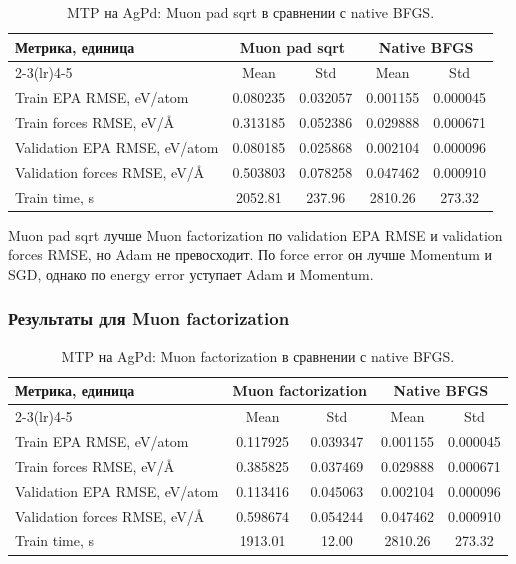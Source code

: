 \begin{table}[H]
\centering
\small
\caption{MTP на AgPd: Muon pad sqrt в сравнении с native BFGS.}
\label{tab:mtp-muon-pad}
\begin{tabular}{lcccc}
\toprule
\multirow{2}{*}{Метрика, единица} & \multicolumn{2}{c}{Muon pad sqrt} & \multicolumn{2}{c}{Native BFGS} \\
\cmidrule(lr){2-3}\cmidrule(lr){4-5}
 & Mean & Std & Mean & Std \\
\midrule
Train EPA RMSE, eV/atom & 0.080235 & 0.032057 & 0.001155 & 0.000045 \\
Train forces RMSE, eV/\AA & 0.313185 & 0.052386 & 0.029888 & 0.000671 \\
Validation EPA RMSE, eV/atom & 0.080185 & 0.025868 & 0.002104 & 0.000096 \\
Validation forces RMSE, eV/\AA & 0.503803 & 0.078258 & 0.047462 & 0.000910 \\
Train time, s & 2052.81 & 237.96 & 2810.26 & 273.32 \\
\bottomrule
\end{tabular}
\end{table}


Muon pad sqrt лучше Muon factorization по validation EPA RMSE и validation forces RMSE, но Adam не превосходит. По force error он лучше Momentum и SGD, однако по energy error уступает Adam и Momentum.

\FloatBarrier

\subsubsection{Результаты для Muon factorization}

\begin{table}[H]
\centering
\small
\caption{MTP на AgPd: Muon factorization в сравнении с native BFGS.}
\label{tab:mtp-muon-factor}
\begin{tabular}{lcccc}
\toprule
\multirow{2}{*}{Метрика, единица} & \multicolumn{2}{c}{Muon factorization} & \multicolumn{2}{c}{Native BFGS} \\
\cmidrule(lr){2-3}\cmidrule(lr){4-5}
 & Mean & Std & Mean & Std \\
\midrule
Train EPA RMSE, eV/atom & 0.117925 & 0.039347 & 0.001155 & 0.000045 \\
Train forces RMSE, eV/\AA & 0.385825 & 0.037469 & 0.029888 & 0.000671 \\
Validation EPA RMSE, eV/atom & 0.113416 & 0.045063 & 0.002104 & 0.000096 \\
Validation forces RMSE, eV/\AA & 0.598674 & 0.054244 & 0.047462 & 0.000910 \\
Train time, s & 1913.01 & 12.00 & 2810.26 & 273.32 \\
\bottomrule
\end{tabular}
\end{table}

